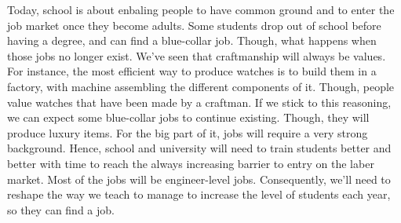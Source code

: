 \documentclass[12pt]{article}
\begin{document}
Today, school is about enbaling people to have common ground and to enter the
job market once they become adults. Some students drop out of school before
having a degree, and can find a blue-collar job. Though, what happens when those
jobs no longer exist.
We've seen that craftmanship will always be values. For instance, the most
efficient way to produce watches is to build them in a factory, with machine
assembling the different components of it. Though, people value watches that have
been made by a craftman. If we stick to this reasoning, we can expect some
blue-collar jobs to continue existing. Though, they will produce luxury items.
For the big part of it, jobs will require a very strong background. Hence,
school and university will need to train students better and better with time to
reach the always increasing barrier to entry on the laber market. Most of the
jobs will be engineer-level jobs.
Consequently, we'll need to reshape the way we teach to manage to increase the
level of students each year, so they can find a job.

\pagebreak


%
%
\end{document}
